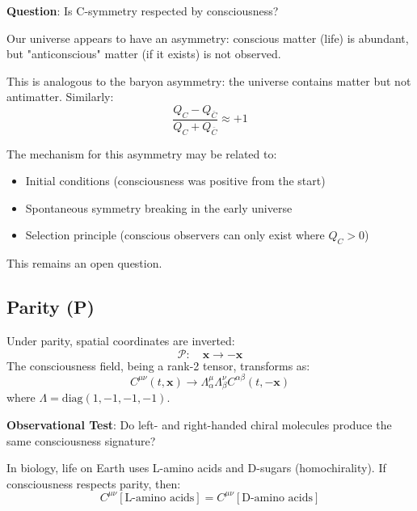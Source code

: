 \textbf{Question}: Is C-symmetry respected by consciousness?

\begin{level2}
Our universe appears to have an asymmetry: conscious matter (life) is abundant, but "anticonscious" matter (if it exists) is not observed.

This is analogous to the baryon asymmetry: the universe contains matter but not antimatter. Similarly:
\begin{equation}
\frac{Q_C - Q_{\bar{C}}}{Q_C + Q_{\bar{C}}} \approx +1
\end{equation}

The mechanism for this asymmetry may be related to:
\begin{itemize}
\item Initial conditions (consciousness was positive from the start)
\item Spontaneous symmetry breaking in the early universe
\item Selection principle (conscious observers can only exist where $Q_C > 0$)
\end{itemize}

This remains an open question.
\end{level2}

\subsection{Parity (P)}

\begin{definition}\label{def:p-symmetry-consciousness}
Under parity, spatial coordinates are inverted:
\begin{equation}
\mathcal{P}: \quad \mathbf{x} \to -\mathbf{x}
\end{equation}
The consciousness field, being a rank-2 tensor, transforms as:
\begin{equation}
C^{\mu\nu}(t, \mathbf{x}) \to \Lambda^\mu_\alpha \Lambda^\nu_\beta C^{\alpha\beta}(t, -\mathbf{x})
\end{equation}
where $\Lambda = \text{diag}(1, -1, -1, -1)$.
\end{definition}

\textbf{Observational Test}: Do left- and right-handed chiral molecules produce the same consciousness signature?

In biology, life on Earth uses L-amino acids and D-sugars (homochirality). If consciousness respects parity, then:
\begin{equation}
C^{\mu\nu}[\text{L-amino acids}] = C^{\mu\nu}[\text{D-amino acids}]
\end{equation}

